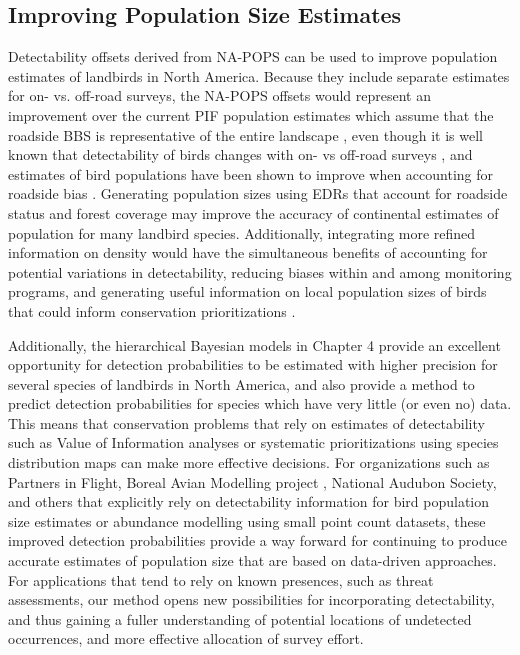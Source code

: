 \subsection{Improving Population Size Estimates}

\par Detectability offsets derived from NA-POPS can be used to improve population estimates of landbirds in North America. 
Because they include separate estimates for on- vs. off-road surveys, the NA-POPS offsets would represent an improvement over the current PIF population estimates which assume that the roadside BBS is representative of the entire landscape \citep{rosenberg_partners_2016, stanton_estimating_2019}, even though it is well known that detectability of birds changes with on- vs off-road surveys \citep{sauer_first_2017, yip_sound_2017, cooke_road_2020}, and estimates of bird populations have been shown to improve when accounting for roadside bias \citep{solymos_lessons_2020}. 
Generating population sizes using EDRs that account for roadside status and forest coverage may improve the accuracy of continental estimates of population for many landbird species. 
Additionally, integrating more refined information on density would have the simultaneous benefits of accounting for potential variations in detectability, reducing biases within and among monitoring programs, and generating useful information on local population sizes of birds that could inform conservation prioritizations \citep{veloz_improving_2015}.

Additionally, the hierarchical Bayesian models in Chapter 4 provide an excellent opportunity for detection probabilities to be estimated with higher precision for several species of landbirds in North America, and also provide a method to predict detection probabilities for species which have very little (or even no) data. 
This means that conservation problems that rely on estimates of detectability such as Value of Information analyses \citep{canessa_when_2015, bennett_when_2018} or systematic prioritizations using species distribution maps \citep{hanson_systematic_2024} can make more effective decisions.
For organizations such as Partners in Flight, Boreal Avian Modelling project \citep{cumming_toward_2010}, National Audubon Society, and others that explicitly rely on detectability information for bird population size estimates or abundance modelling using small point count datasets, these improved detection probabilities provide a way forward for continuing to produce accurate estimates of population size that are based on data-driven approaches.
For applications that tend to rely on known presences, such as threat assessments, our method opens new possibilities for incorporating detectability, and thus gaining a fuller understanding of  potential locations of undetected occurrences, and more effective allocation of survey effort.

